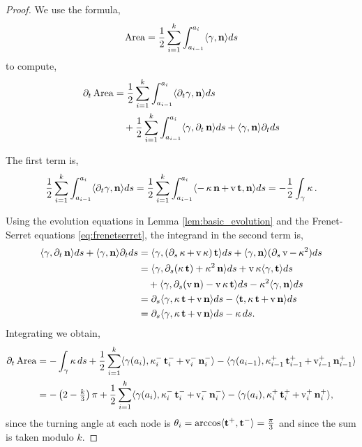 \documentclass[11pt]{amsart}
\begin{document}
\begin{proof}
We use the formula,
\[
\operatorname{Area} = \frac{1}{2} \sum_{i=1}^k \int_{a_{i-1}}^{a_i} \langle{\gamma},{\operatorname{\mathbf{n}}}\rangle ds
\]
to compute,
\[
\begin{split}
\partial_t \operatorname{Area} &= \frac{1}{2} \sum_{i=1}^k \int_{a_{i-1}}^{a_i} \langle{\partial_t \gamma},{\operatorname{\mathbf{n}}}\rangle ds \\
&\quad + \frac{1}{2} \sum_{i=1}^k \int_{a_{i-1}}^{a_i} \langle{\gamma},{\partial_t \operatorname{\mathbf{n}}}\rangle ds + \langle{\gamma},{\operatorname{\mathbf{n}}}\rangle \partial_t ds
\end{split}
\]

The first term is,
\[
\frac{1}{2} \sum_{i=1}^k \int_{a_{i-1}}^{a_i} \langle{\partial_t \gamma},{\operatorname{\mathbf{n}}}\rangle ds = \frac{1}{2} \sum_{i=1}^k \int_{a_{i-1}}^{a_i} \langle{-\operatorname{\kappa}\operatorname{\mathbf{n}}+ \operatorname{v}\operatorname{\mathbf{t}}},{\operatorname{\mathbf{n}}}\rangle ds = -\frac{1}{2} \int_{\gamma} \operatorname{\kappa}.
\]

Using the evolution equations in Lemma \ref{lem:basic_evolution} and the Frenet-Serret equations \eqref{eq:frenetserret}, the integrand in the second term is,
\[
\begin{split}
\langle{\gamma},{\partial_t \operatorname{\mathbf{n}}}\rangle ds + \langle{\gamma},{\operatorname{\mathbf{n}}}\rangle \partial_t ds &= \langle{\gamma},{(\partial_s \operatorname{\kappa} + \operatorname{v} \operatorname{\kappa})\operatorname{\mathbf{t}}}\rangle ds + \langle{\gamma},{\operatorname{\mathbf{n}}}\rangle (\partial_s \operatorname{v} - \operatorname{\kappa}^2) ds \\
&= \langle{\gamma},{\partial_s(\operatorname{\kappa}\operatorname{\mathbf{t}}) + \operatorname{\kappa}^2 \operatorname{\mathbf{n}}}\rangle ds + \operatorname{v}\operatorname{\kappa} \langle{\gamma},{\operatorname{\mathbf{t}}}\rangle ds \\
&\quad + \langle{\gamma},{\partial_s (\operatorname{v} \operatorname{\mathbf{n}}) - \operatorname{v} \operatorname{\kappa} \operatorname{\mathbf{t}}}\rangle ds - \operatorname{\kappa}^2 \langle{\gamma},{\operatorname{\mathbf{n}}}\rangle ds \\
&= \partial_s \langle{\gamma},{\operatorname{\kappa}\operatorname{\mathbf{t}} + \operatorname{v} \operatorname{\mathbf{n}}}\rangle ds - \langle{\operatorname{\mathbf{t}}},{\operatorname{\kappa} \operatorname{\mathbf{t}} + \operatorname{v} \operatorname{\mathbf{n}}}\rangle ds \\
&= \partial_s \langle{\gamma},{\operatorname{\kappa}\operatorname{\mathbf{t}} + \operatorname{v} \operatorname{\mathbf{n}}}\rangle ds - \operatorname{\kappa} ds.
\end{split}
\]
Integrating we obtain,
\begin{equation}
\label{eq:dtA_prelim}
\begin{split}
\partial_t \area &= -\int_{\gamma} \curvecurv ds + \frac{1}{2} \sum_{i=1}^k \ip{\gamma(a_i)}{\curvecurv_i^- \tang_i^- + \tangspeed_i^- \nor_i^-} - \ip{\gamma(a_{i-1})}{\curvecurv_{i-1}^+ \tang_{i-1}^+ + \tangspeed_{i-1}^+ \nor_{i-1}^+} \\
&= - \left(2 - \tfrac{k}{3}\right)\pi + \frac{1}{2} \sum_{i=1}^k \ip{\gamma(a_i)}{\curvecurv_i^- \tang_i^- + \tangspeed_i^- \nor_i^-} - \ip{\gamma(a_i)}{\curvecurv_i^+ \tang_i^+ + \tangspeed_i^+ \nor_i^+},
\end{split}
\end{equation}
since the turning angle at each node is \(\theta_i = \arccos \langle{\operatorname{\mathbf{t}}^+},{\operatorname{\mathbf{t}}^-}\rangle = \tfrac{\pi}{3}\) and since the sum is taken modulo \(k\).


\end{proof}
\end{document}
